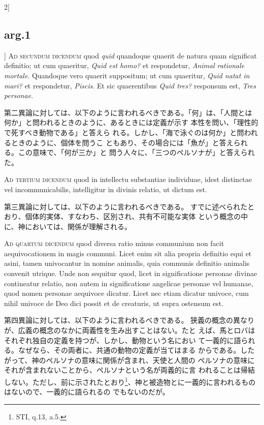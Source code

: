 \documentclass[paper=a4paper,fontsize=10pt,jafontsize=9pt,titlepage]{jlreq}
\begin{document}
\begin{paracol}{2}[\subsection{arg.1}]
{\scshape Ad secundum dicendum} quod {\itshape quid} quandoque quaerit de natura quam
significat definitio; ut cum quaeritur, {\itshape Quid est homo?} et respondetur,
{\itshape Animal rationale mortale}. Quandoque vero quaerit suppositum; ut cum
quaeritur, {\itshape Quid natat in mari?} et respondetur, {\itshape Piscis}. Et sic
quaerentibus {\itshape Quid tres?} responsum est, {\itshape Tres personae}.

\switchcolumn

第二異論に対しては、以下のように言われるべきである。「何」は、「人間とは
 何か」と問われるときのように、あるときには定義が示す
 本性を問い、「理性的で死すべき動物である」と答えら
 れる。しかし、「海で泳ぐのは何か」と問われるときのように、個体を問うこ
 ともあり、その場合には「魚が」と答えられる。この意味で、「何が三か」と
 問う人々に、「三つのペルソナが」と答えられた。

\switchcolumn*[\subsection{ad.3}]

{\scshape Ad tertium dicendum} quod in intellectu substantiae individuae, idest
distinctae vel incommunicabilis, intelligitur in divinis relatio, ut
dictum est.

\switchcolumn

第三異論に対しては、以下のように言われるべきである。
すでに述べられたとおり、個体的実体、すなわち、区別され、共有不可能な実体
 という概念の中に、神においては、関係が理解される。

\switchcolumn*[\subsection{ad.4}]

{\scshape Ad quartum dicendum} quod diversa ratio minus communium non facit
aequivocationem in magis communi. Licet enim sit alia propria definitio
equi et asini, tamen univocantur in nomine animalis, quia communis
definitio animalis convenit utrique. Unde non sequitur quod, licet in
significatione personae divinae contineatur relatio, non autem in
significatione angelicae personae vel humanae, quod nomen personae
aequivoce dicatur. Licet nec etiam dicatur univoce, cum nihil univoce de
Deo dici possit et de creaturis, ut supra ostensum est.

\switchcolumn

第四異論に対しては、以下のように言われるべきである。
狭義の概念の異なりが、広義の概念のなかに両義性を生み出すことはない。たと
 えば、馬とロバはそれぞれ独自の定義を持つが、しかし、動物という名におい
 て一義的に語られる。なぜなら、その両者に、共通の動物の定義が当てはまる
 からである。したがって、神のペルソナの意味に関係が含まれ、天使と人間の
 ペルソナの意味にそれが含まれないことから、ペルソナという名が両義的に言
 われることは帰結しない。ただし、前に示されたとおり\footnote{STI, q.13,
 a.5.}、神と被造物とに一義的に言われるものはないので、一義的に語られるの
 でもないのだが。

\end{paracol}
\end{document}
